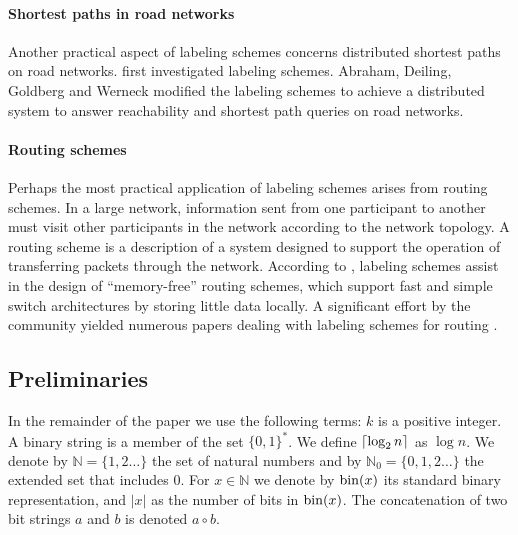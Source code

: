 \paragraph{Shortest paths in road networks}
Another practical aspect of labeling schemes concerns distributed shortest paths  on road networks. 
 first investigated \distance labeling schemes. 
Abraham, Deiling, Goldberg and Werneck  modified the labeling schemes to achieve a distributed system to answer reachability and shortest path queries on road networks.

\paragraph{Routing schemes}
Perhaps the most  practical application of labeling schemes arises from  routing schemes.
In a large network, information sent from one participant  to another must visit   other participants in the network according to the network topology. 
A routing scheme is a description of a  system designed to support the operation of transferring packets through the network.
According to , labeling schemes  assist in the design of ``memory-free'' routing schemes, which support fast and simple switch architectures by  storing  little data locally.
 A significant effort by the community yielded numerous  papers dealing with labeling schemes for routing \cite{Peleg03,Thorup01,Fraigniaud01,gavoille96,Dom07,Korman07K,krioukov2004compact,abraham2006routing,abraham2005name}.





\subsection{Preliminaries}\label{section:preliminaries}
In the remainder of the paper we use the following terms:
			$k$ is a positive integer.
			A binary string is a member of the set $\{ 0,1 \}^*$.
			We define $\left\lceil{ \log_2{n}}\right\rceil$ as $\log{n}$.   %
			We denote by $\mathbb{N} = \{1,2 \dots \} $ the set of natural numbers and by $\mathbb{N}_0 = \{0,1,2 \dots \} $ the extended set that includes $0$.
			For $x \in \mathbb{N}$ we denote by $\operatorname{bin}(x)$ its standard binary representation, and $\vert x \vert$ as the number of bits in $\operatorname{bin}(x)$. 
			The concatenation of two bit strings $a$ and $b$ is denoted $a \circ b$.
